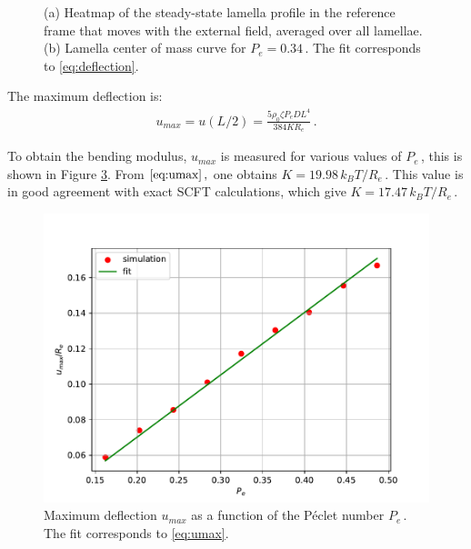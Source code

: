 \documentclass[bachelor,       %
               twoside,        %
               BCOR10mm,       %
               ngerman, english %
               ]{GAUBM}
\begin{document}
\begin{figure}[h]
\begin{subfigure}[b]{0.45\textwidth}
      \caption{}
      \label{fig:lamella_deflection}
  \end{subfigure}
     \caption{(a) Heatmap of the steady-state lamella profile in the reference frame that moves with the external field, averaged over all lamellae. (b) Lamella center of mass curve for $P_e=0.34\,$. The fit corresponds to \eqref{eq:deflection}.}
     \label{fig:lamella_bent}
\end{figure}


The maximum deflection is:
\begin{align}
    u_{max}=u(L/2)=\frac{5\rho_0\zeta P_e DL^4}{384KR_e}\,.
    \label{eq:umax}
\end{align}

To obtain the bending modulus, $u_{max}$ is measured for various values of $P_e\,$, this is shown in Figure \ref{fig:stress_strain}. From $\eqref{eq:umax}\,,$ one obtains $K=19.98\,k_BT/R_e\,.$ This value is in good agreement with exact SCFT calculations, which give $K=17.47\,k_BT/R_e\,.$ 







\begin{figure}[h]
    \centering
    \includegraphics[width=0.6\linewidth]{figures/stress_strain_plot.pdf}
    \caption{Maximum deflection  $u_{max}$ as a function of the P\'eclet number $P_e\,.$ The fit corresponds to \eqref{eq:umax}.}
    \label{fig:stress_strain}
\end{figure}
\end{document}
